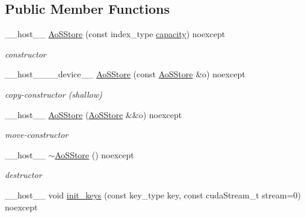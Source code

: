 \subsection*{Public Member Functions}
\begin{DoxyCompactItemize}
\item 
\+\_\+\+\_\+host\+\_\+\+\_\+ \hyperlink{classwarpcore_1_1storage_1_1key__value_1_1AoSStore_a4ab568a9090dfe80c989ba7d88173010}{Ao\+S\+Store} (const index\+\_\+type \hyperlink{classwarpcore_1_1storage_1_1key__value_1_1AoSStore_a23c4cb728f870dfa09a0d0d976cedf8e}{capacity}) noexcept
\begin{DoxyCompactList}\small\item\em constructor \end{DoxyCompactList}\item 
\+\_\+\+\_\+host\+\_\+\+\_\+\+\_\+\+\_\+device\+\_\+\+\_\+ \hyperlink{classwarpcore_1_1storage_1_1key__value_1_1AoSStore_a55dc641ec2d9643973506f6ed0c4b817}{Ao\+S\+Store} (const \hyperlink{classwarpcore_1_1storage_1_1key__value_1_1AoSStore}{Ao\+S\+Store} \&o) noexcept
\begin{DoxyCompactList}\small\item\em copy-\/constructor (shallow) \end{DoxyCompactList}\item 
\+\_\+\+\_\+host\+\_\+\+\_\+ \hyperlink{classwarpcore_1_1storage_1_1key__value_1_1AoSStore_ae3eef233b7fd2dbfeedd90c72c119d29}{Ao\+S\+Store} (\hyperlink{classwarpcore_1_1storage_1_1key__value_1_1AoSStore}{Ao\+S\+Store} \&\&o) noexcept
\begin{DoxyCompactList}\small\item\em move-\/constructor \end{DoxyCompactList}\item 
\mbox{\label{classwarpcore_1_1storage_1_1key__value_1_1AoSStore_a0007916878191e222fd831f379eac189}} 
\+\_\+\+\_\+host\+\_\+\+\_\+ \hyperlink{classwarpcore_1_1storage_1_1key__value_1_1AoSStore_a0007916878191e222fd831f379eac189}{$\sim$\+Ao\+S\+Store} () noexcept
\begin{DoxyCompactList}\small\item\em destructor \end{DoxyCompactList}\item 
\+\_\+\+\_\+host\+\_\+\+\_\+ void \hyperlink{classwarpcore_1_1storage_1_1key__value_1_1AoSStore_abd88eb047b4435c11bb639df0e2fd7ee}{init\+\_\+keys} (const key\+\_\+type key, const cuda\+Stream\+\_\+t stream=0) noexcept

\end{DoxyCompactItemize}

